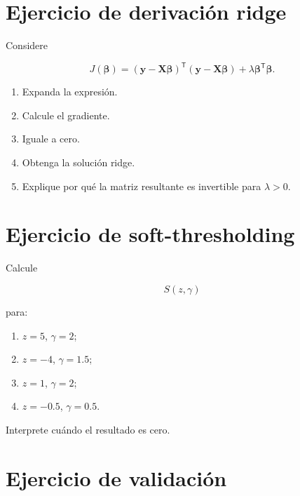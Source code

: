 \documentclass[
  spanish,
  10.5pt,
  letterpaper,
  DIV=11,
  numbers=noendperiod,
  oneside,
  open=any]{scrreprt}
\providecommand{\tightlist}{%
  \setlength{\itemsep}{0pt}\setlength{\parskip}{0pt}}
\theoremstyle{definition}
\theoremstyle{definition}
\theoremstyle{plain}
\theoremstyle{remark}
\begin{document}
\section*{Ejercicio de derivación
ridge}\label{ejercicio-de-derivaciuxf3n-ridge}


Considere

\[
J(\boldsymbol{\beta})
=
(\mathbf{y}-\mathbf{X}\boldsymbol{\beta})^{\mathsf T}
(\mathbf{y}-\mathbf{X}\boldsymbol{\beta})
+
\lambda
\boldsymbol{\beta}^{\mathsf T}\boldsymbol{\beta}.
\]

\begin{enumerate}
\def\labelenumi{\arabic{enumi}.}
\tightlist
\item
  Expanda la expresión.
\item
  Calcule el gradiente.
\item
  Iguale a cero.
\item
  Obtenga la solución ridge.
\item
  Explique por qué la matriz resultante es invertible para
  \(\lambda>0\).
\end{enumerate}

\section*{Ejercicio de
soft-thresholding}\label{ejercicio-de-soft-thresholding}


Calcule

\[
S(z,\gamma)
\]

para:

\begin{enumerate}
\def\labelenumi{\arabic{enumi}.}
\tightlist
\item
  \(z=5\), \(\gamma=2\);
\item
  \(z=-4\), \(\gamma=1.5\);
\item
  \(z=1\), \(\gamma=2\);
\item
  \(z=-0.5\), \(\gamma=0.5\).
\end{enumerate}

Interprete cuándo el resultado es cero.

\section*{Ejercicio de validación}\label{ejercicio-de-validaciuxf3n}
\end{document}
